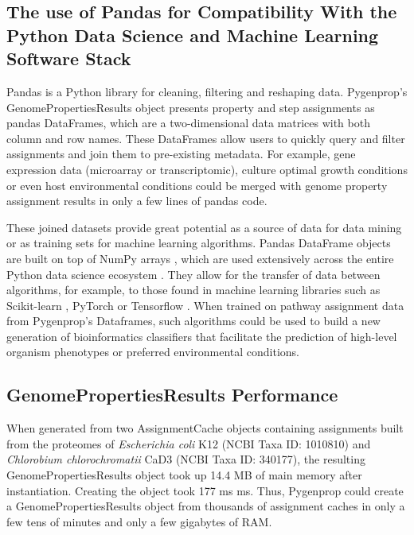 \subsection{The use of Pandas for Compatibility With the Python Data Science and Machine Learning Software Stack}

Pandas is a Python library for cleaning, filtering and reshaping data. Pygenprop's GenomePropertiesResults object presents property and step assignments as pandas DataFrames, which are a two-dimensional data matrices with both column and row names. These DataFrames allow users to quickly query and filter assignments and join them to pre-existing metadata. For example, gene expression data (microarray or transcriptomic), culture optimal growth conditions or even host environmental conditions could be merged with genome property assignment results in only a few lines of pandas code.

These joined datasets provide great potential as a source of data for data mining or as training sets for machine learning algorithms. Pandas DataFrame objects are built on top of NumPy arrays \cite{mckinney2010data}, which are used extensively across the entire Python data science ecosystem \cite{scipystack}. They allow for the transfer of data between algorithms, for example, to those found in machine learning libraries such as Scikit-learn \cite{pedregosa2011scikit}, PyTorch \cite{Paszke2017} or Tensorflow \cite{abadi2016tensorflow}.  When trained on pathway assignment data from Pygenprop's Dataframes, such algorithms could be used to build a new generation of bioinformatics classifiers that facilitate the prediction of high-level organism phenotypes or preferred environmental conditions.

\subsection{GenomePropertiesResults Performance}

When generated from two AssignmentCache objects containing assignments built from the proteomes of \textit{Escherichia coli} K12 (NCBI Taxa ID: 1010810) and \textit{Chlorobium chlorochromatii} CaD3 (NCBI Taxa ID: 340177), the resulting GenomePropertiesResults object took up 14.4 MB of main memory after instantiation. Creating the object took 177 ms  ms. Thus, Pygenprop could create a GenomePropertiesResults object from thousands of assignment caches in only a few tens of minutes and only a few gigabytes of RAM. 

